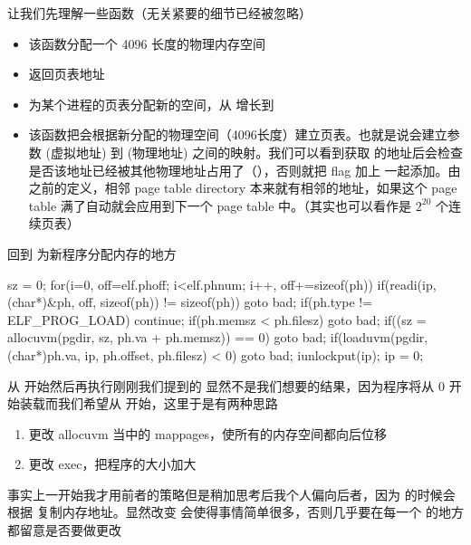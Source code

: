 让我们先理解一些函数（无关紧要的细节已经被忽略）

\begin{itemize}
    \item {} 该函数分配一个 4096 长度的物理内存空间
    \item {} 返回页表地址
    \item {} 为某个进程的页表分配新的空间，从  增长到 
    \item {} 该函数把会根据新分配的物理空间（4096长度）建立页表。也就是说会建立参数  (虚拟地址) 到  (物理地址) 之间的映射。我们可以看到获取  的地址后会检查是否该地址已经被其他物理地址占用了（），否则就把 flag 加上  一起添加。由之前的定义，相邻 page table directory 本来就有相邻的地址，如果这个 page table 满了自动就会应用到下一个 page table 中。（其实也可以看作是 $2^{20}$ 个连续页表）
\end{itemize}

回到  为新程序分配内存的地方

\begin{ccode}
    sz = 0;
    for(i=0, off=elf.phoff; i<elf.phnum; i++, off+=sizeof(ph)){
        if(readi(ip, (char*)&ph, off, sizeof(ph)) != sizeof(ph))
        goto bad;
        if(ph.type != ELF_PROG_LOAD)
        continue;
        if(ph.memsz < ph.filesz)
        goto bad;
        if((sz = allocuvm(pgdir, sz, ph.va + ph.memsz)) == 0)
        goto bad;
        if(loaduvm(pgdir, (char*)ph.va, ip, ph.offset, ph.filesz) < 0)
        goto bad;
    }
    iunlockput(ip);
    ip = 0;
\end{ccode}



从  开始然后再执行刚刚我们提到的  显然不是我们想要的结果，因为程序将从 0 开始装载而我们希望从  开始，这里于是有两种思路

\begin{enumerate}
    \item 更改 allocuvm 当中的 mappages，使所有的内存空间都向后位移 
    \item 更改 exec，把程序的大小加大 
\end{enumerate}

事实上一开始我才用前者的策略但是稍加思考后我个人偏向后者，因为  的时候会根据  复制内存地址。显然改变  会使得事情简单很多，否则几乎要在每一个  的地方都留意是否要做更改

